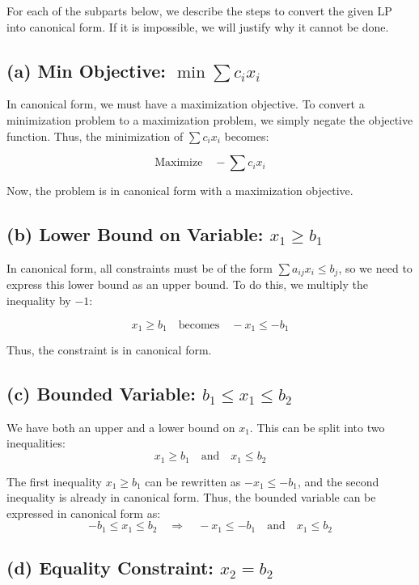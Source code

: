 \documentclass[11pt]{article}
\begin{document}
For each of the subparts below, we describe the steps to convert the given LP into canonical form. If it is impossible, we will justify why it cannot be done.

\subsection*{(a) Min Objective: \( \min \sum c_i x_i \)}

In canonical form, we must have a maximization objective. To convert a minimization problem to a maximization problem, we simply negate the objective function. Thus, the minimization of \( \sum c_i x_i \) becomes:

\[
\text{Maximize} \quad - \sum c_i x_i
\]

Now, the problem is in canonical form with a maximization objective.

\subsection*{(b) Lower Bound on Variable: \( x_1 \geq b_1 \)}

In canonical form, all constraints must be of the form \( \sum a_{ij}x_i \leq b_j \), so we need to express this lower bound as an upper bound. To do this, we multiply the inequality by \( -1 \):

\[
x_1 \geq b_1 \quad \text{becomes} \quad -x_1 \leq -b_1
\]

Thus, the constraint is in canonical form.

\subsection*{(c) Bounded Variable: \( b_1 \leq x_1 \leq b_2 \)}

We have both an upper and a lower bound on \( x_1 \). This can be split into two inequalities:
\[
x_1 \geq b_1 \quad \text{and} \quad x_1 \leq b_2
\]

The first inequality \( x_1 \geq b_1 \) can be rewritten as \( -x_1 \leq -b_1 \), and the second inequality is already in canonical form. Thus, the bounded variable can be expressed in canonical form as:
\[
-b_1 \leq x_1 \leq b_2 \quad \Rightarrow \quad -x_1 \leq -b_1 \quad \text{and} \quad x_1 \leq b_2
\]

\subsection*{(d) Equality Constraint: \( x_2 = b_2 \)}
\end{document}
